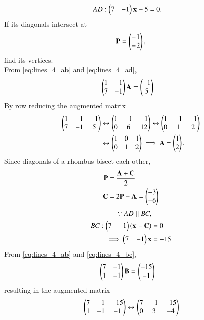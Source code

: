 \documentclass[journal,12pt,twocolumn]{IEEEtran}
\begin{document}
\begin{enumerate}[label=\arabic*]
\begin{align}
AD: \begin{pmatrix}7 & -1\end{pmatrix}\mathbf{x} -5 &=0.
\label{eq:lines_4_ad}
\end{align}
%
If its diagonals intersect at 
\begin{equation}
\mathbf{P}=\begin{pmatrix}-1\\ -2\end{pmatrix},
\label{eq:lines_4_p}
\end{equation}
find its vertices.
\\
\solution From \eqref{eq:lines_4_ab} and \eqref{eq:lines_4_ad},
\begin{align}
\begin{pmatrix}1 & -1 \\ 7 & -1\end{pmatrix}\mathbf{A}  &=\begin{pmatrix}-1 \\ 5\end{pmatrix}
\end{align}
%
By row reducing the augmented matrix
\begin{align}
\begin{pmatrix}1 & -1 & -1\\ 7 & -1 & 5\end{pmatrix}  &\leftrightarrow \begin{pmatrix}1 & -1 & -1\\ 0 & 6 & 12\end{pmatrix}\leftrightarrow \begin{pmatrix}1 & -1 & -1\\ 0 & 1 & 2\end{pmatrix}
\nonumber \\
&\leftrightarrow \begin{pmatrix}1 & 0 & 1\\ 0 & 1 & 2\end{pmatrix} \implies \mathbf{A}=\begin{pmatrix}1\\ 2\end{pmatrix},
\label{eq:lines_4_a}
\end{align}
%
Since diagonals of a rhombus bisect each other, 
\begin{align}
\mathbf{P}&=\frac{\mathbf{A}+\mathbf{C}}{2}
\nonumber \\
\mathbf{C}&=2\mathbf{P}-\mathbf{A} = \begin{pmatrix}-3\\-6\end{pmatrix}
\label{eq:lines_4_c}
\end{align}
%
\begin{align}
\because AD \parallel BC,&
\nonumber \\
BC: \begin{pmatrix}7 & -1\end{pmatrix}\left(\mathbf{x}-\mathbf{C}\right) &=0
\nonumber \\
\implies \begin{pmatrix}7 & -1\end{pmatrix}\mathbf{x} &=-15
\label{eq:lines_4_bc}
\end{align}
%
From \eqref{eq:lines_4_ab} and \eqref{eq:lines_4_bc},
\begin{align}
 \begin{pmatrix}7 & -1 \\ 1 & -1\end{pmatrix}\mathbf{B} &=\begin{pmatrix}-15 \\ -1\end{pmatrix}
\end{align}
resulting in the augmented matrix
\begin{align}
& \myvec{7 & -1 & -15\\ 1 & -1 & -1} 
\leftrightarrow
 \myvec{7 & -1 & -15\\ 0 & 3 & -4} 
\nonumber \\

\end{align}
\end{enumerate}
\end{document}
